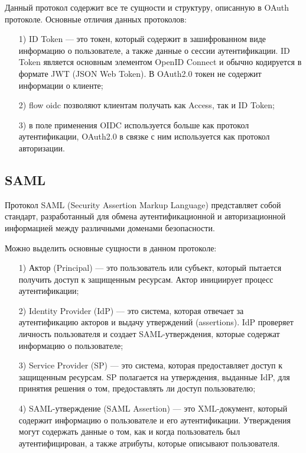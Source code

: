 Данный протокол содержит все те сущности и структуру, описанную в OAuth протоколе.
Основные отличия данных протоколов:
 \begin{enumerate}
  \item[1)] ID Token --- это токен, который содержит в зашифрованном виде информацию о пользователе, а также данные о сессии аутентификации. ID Token является основным элементом OpenID Connect и обычно кодируется в формате JWT (JSON Web Token). В OAuth2.0 токен не содержит информации о клиенте;
  \item[2)] flow oidc позволяют клиентам получать как Access, так и ID Token;
  \item[3)] в поле применения OIDC используется больше как протокол аутентификации, OAuth2.0 в связке с ним используется как протокол авторизации.
\end{enumerate}

\subsection{SAML}
Протокол SAML (Security Assertion Markup Language) представляет собой стандарт, разработанный для обмена аутентификационной и авторизационной информацией между различными доменами безопасности.

Можно выделить основные сущности в данном протоколе:
 \begin{enumerate}
  \item[1)] Актор (Principal) --- это пользователь или субъект, который пытается получить доступ к защищенным ресурсам. Актор инициирует процесс аутентификации;
  \item[2)] Identity Provider (IdP) --- это система, которая отвечает за аутентификацию акторов и выдачу утверждений (assertions). IdP проверяет личность пользователя и создает SAML-утверждения, которые содержат информацию о пользователе;
  \item[3)] Service Provider (SP) --- это система, которая предоставляет доступ к защищенным ресурсам. SP полагается на утверждения, выданные IdP, для принятия решения о том, предоставлять ли доступ пользователю;
  \item[4)] SAML-утверждение (SAML Assertion) --- это XML-документ, который содержит информацию о пользователе и его аутентификации. Утверждения могут содержать данные о том, как и когда пользователь был аутентифицирован, а также атрибуты, которые описывают пользователя.
\end{enumerate}

